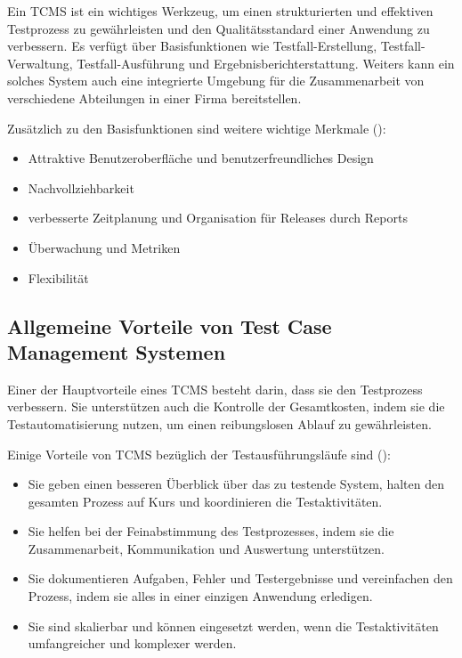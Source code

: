 \documentclass[a4paper, fontsize=11pt, parskip=half, twoside]{scrreprt}
\begin{document}
	Ein \ac{TCMS} ist ein wichtiges Werkzeug, um einen strukturierten und effektiven Testprozess zu gewährleisten und den Qualitätsstandard einer Anwendung zu verbessern.
	Es verfügt über Basisfunktionen wie Testfall-Erstellung, Testfall-Verwaltung, Testfall-Ausführung und Ergebnisberichterstattung. 
	Weiters kann ein solches System auch eine integrierte Umgebung für die Zusammenarbeit von verschiedene Abteilungen in einer Firma bereitstellen.
	
	Zusätzlich zu den Basisfunktionen sind weitere wichtige Merkmale (\textcite{lead_articles_nodate}):
	
	\begin{itemize}
		\item Attraktive Benutzeroberfläche und benutzerfreundliches Design
		\item Nachvollziehbarkeit
		\item verbesserte Zeitplanung und Organisation für Releases durch Reports
		\item Überwachung und Metriken
		\item Flexibilität
	\end{itemize}
	
	
	\subsection{Allgemeine Vorteile von Test Case Management Systemen}
	Einer der Hauptvorteile eines \ac{TCMS} besteht darin, dass sie den Testprozess verbessern. 
	Sie unterstützen auch die Kontrolle der Gesamtkosten, indem sie die Testautomatisierung nutzen, um einen reibungslosen Ablauf zu gewährleisten.  
	
	Einige Vorteile von \ac{TCMS} bezüglich der Testausführungsläufe sind (\textcite{lead_articles_nodate}):
	
	\begin{itemize}
		\item Sie geben einen besseren Überblick über das zu testende System, halten den gesamten Prozess auf Kurs und koordinieren die Testaktivitäten.
		\item Sie helfen bei der Feinabstimmung des Testprozesses, indem sie die Zusammenarbeit, Kommunikation und Auswertung unterstützen.
		\item Sie dokumentieren Aufgaben, Fehler und Testergebnisse und vereinfachen den Prozess, indem sie alles in einer einzigen Anwendung erledigen.
		\item Sie sind skalierbar und können eingesetzt werden, wenn die Testaktivitäten umfangreicher und komplexer werden.
	\end{itemize}
	
\end{document}
